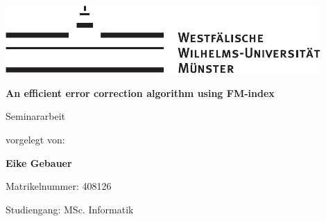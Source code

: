 \begin{centering}
\vspace*{\fill}
\includegraphics[width=12cm]{./img/wwu-logo-neu.pdf}

\vspace{3cm} 

{\LARGE
	\textbf{An efficient error correction algorithm using FM-index}\\[1.2cm]
}

{\large
	Seminararbeit\\[2cm]
}

{\large
	vorgelegt von:
}

{ \Large
	\textbf{Eike Gebauer}\\[1cm]
}

{\large
	Matrikelnummer: 408126\\[2mm]
}

{\large
	Studiengang: MSc. Informatik\\[1cm]
}
\vfill
\end{centering}